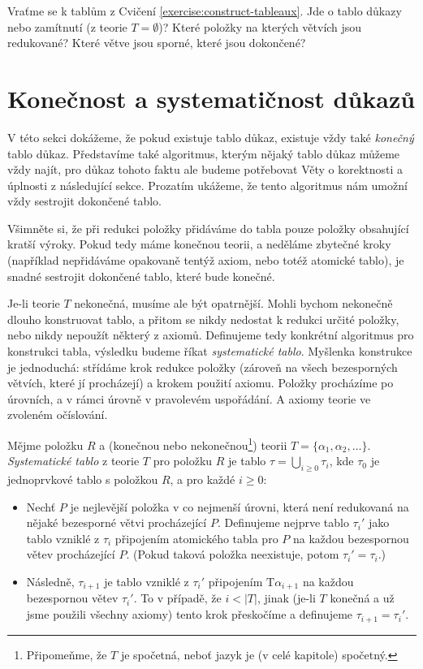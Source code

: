 \begin{exercise}
    Vraťme se k tablům z Cvičení \ref{exercise:construct-tableaux}. Jde o tablo důkazy nebo zamítnutí (z teorie $T=\emptyset$)? Které položky na kterých větvích jsou redukované? Které větve jsou sporné, které jsou dokončené?
\end{exercise}

\section{Konečnost a systematičnost důkazů}\label{section:finiteness-and-systematicity-of-proofs}

V této sekci dokážeme, že pokud existuje tablo důkaz, existuje vždy také \emph{konečný} tablo důkaz. Představíme také algoritmus, kterým nějaký tablo důkaz můžeme vždy najít, pro důkaz tohoto faktu ale budeme potřebovat Věty o korektnosti a úplnosti z následující sekce. Prozatím ukážeme, že tento algoritmus nám umožní vždy sestrojit dokončené tablo.

Všimněte si, že při redukci položky přidáváme do tabla pouze položky obsahující kratší výroky. Pokud tedy máme konečnou teorii, a neděláme zbytečné kroky (například nepřidáváme opakovaně tentýž axiom, nebo totéž atomické tablo), je snadné sestrojit dokončené tablo, které bude konečné.

Je-li teorie $T$ nekonečná, musíme ale být opatrnější. Mohli bychom nekonečně dlouho konstruovat tablo, a přitom se nikdy nedostat k redukci určité položky, nebo nikdy nepoužít některý z axiomů. Definujeme tedy konkrétní algoritmus pro konstrukci tabla, výsledku budeme říkat \emph{systematické tablo}. Myšlenka konstrukce je jednoduchá: střídáme krok redukce položky (zároveň na všech bezesporných větvích, které jí procházejí) a krokem použití axiomu. Položky procházíme po úrovních, a v rámci úrovně v pravolevém uspořádání. A axiomy teorie ve zvoleném očíslování.

\begin{definition}
Mějme položku $R$ a (konečnou nebo nekonečnou\footnote{Připomeňme, že $T$ je spočetná, neboť jazyk je (v celé kapitole) spočetný.}) teorii $T=\{\alpha_1,\alpha_2,\dots\}$. \emph{Systematické tablo} z teorie $T$ pro položku $R$ je tablo $\tau=\bigcup_{i\geq 0}\tau_i$, kde $\tau_0$ je jednoprvkové tablo s položkou $R$, a pro každé $i\geq 0$:

\begin{itemize}
    \item Nechť $P$ je nejlevější položka v co nejmenší úrovni, která není redukovaná na nějaké bezesporné větvi procházející $P$. Definujeme nejprve tablo $\tau_i'$ jako tablo vzniklé z $\tau_i$ připojením atomického tabla pro $P$ na každou bezespornou větev procházející $P$. (Pokud taková položka neexistuje, potom  $\tau_i'=\tau_i$.)
    \item Následně, $\tau_{i+1}$ je tablo vzniklé z $\tau_i'$ připojením $\mathrm{T}\alpha_{i+1}$ na každou bezespornou větev $\tau_i'$. To v případě, že $i<|T|$, jinak (je-li $T$ konečná a už jsme použili všechny axiomy) tento krok přeskočíme a definujeme $\tau_{i+1}=\tau_i'$.
\end{itemize}    
\end{definition}

